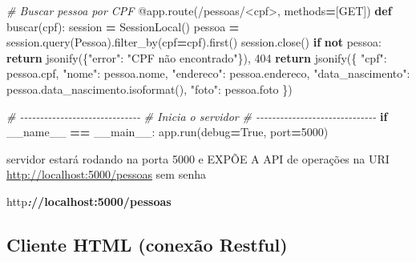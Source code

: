 \documentclass[
]{book}
\newenvironment{Shaded}{\begin{snugshade}}{\end{snugshade}}
\newcommand{\AttributeTok}[1]{\textcolor[rgb]{0.13,0.29,0.53}{#1}}
\newcommand{\CommentTok}[1]{\textcolor[rgb]{0.56,0.35,0.01}{\textit{#1}}}
\newcommand{\ControlFlowTok}[1]{\textcolor[rgb]{0.13,0.29,0.53}{\textbf{#1}}}
\newcommand{\DecValTok}[1]{\textcolor[rgb]{0.00,0.00,0.81}{#1}}
\newcommand{\ErrorTok}[1]{\textcolor[rgb]{0.64,0.00,0.00}{\textbf{#1}}}
\newcommand{\InformationTok}[1]{\textcolor[rgb]{0.56,0.35,0.01}{\textbf{\textit{#1}}}}
\newcommand{\KeywordTok}[1]{\textcolor[rgb]{0.13,0.29,0.53}{\textbf{#1}}}
\newcommand{\NormalTok}[1]{#1}
\newcommand{\OperatorTok}[1]{\textcolor[rgb]{0.81,0.36,0.00}{\textbf{#1}}}
\newcommand{\StringTok}[1]{\textcolor[rgb]{0.31,0.60,0.02}{#1}}
\newcommand{\VariableTok}[1]{\textcolor[rgb]{0.00,0.00,0.00}{#1}}
\begin{document}
\begin{Shaded}
\begin{Highlighting}[]
\CommentTok{\# Buscar pessoa por CPF}
\AttributeTok{@app.route}\NormalTok{(}\StringTok{\textquotesingle{}/pessoas/\textless{}cpf\textgreater{}\textquotesingle{}}\NormalTok{, methods}\OperatorTok{=}\NormalTok{[}\StringTok{\textquotesingle{}GET\textquotesingle{}}\NormalTok{])}
\KeywordTok{def}\NormalTok{ buscar(cpf):}
\NormalTok{    session }\OperatorTok{=}\NormalTok{ SessionLocal()}
\NormalTok{    pessoa }\OperatorTok{=}\NormalTok{ session.query(Pessoa).filter\_by(cpf}\OperatorTok{=}\NormalTok{cpf).first()}
\NormalTok{    session.close()}
    \ControlFlowTok{if} \KeywordTok{not}\NormalTok{ pessoa:}
        \ControlFlowTok{return}\NormalTok{ jsonify(\{}\StringTok{"error"}\NormalTok{: }\StringTok{"CPF não encontrado"}\NormalTok{\}), }\DecValTok{404}
    \ControlFlowTok{return}\NormalTok{ jsonify(\{}
        \StringTok{"cpf"}\NormalTok{: pessoa.cpf,}
        \StringTok{"nome"}\NormalTok{: pessoa.nome,}
        \StringTok{"endereco"}\NormalTok{: pessoa.endereco,}
        \StringTok{"data\_nascimento"}\NormalTok{: pessoa.data\_nascimento.isoformat(),}
        \StringTok{"foto"}\NormalTok{: pessoa.foto}
\NormalTok{    \})}

\CommentTok{\# {-}{-}{-}{-}{-}{-}{-}{-}{-}{-}{-}{-}{-}{-}{-}{-}{-}{-}{-}{-}{-}{-}{-}{-}{-}{-}{-}{-}{-}{-}}
\CommentTok{\# Inicia o servidor}
\CommentTok{\# {-}{-}{-}{-}{-}{-}{-}{-}{-}{-}{-}{-}{-}{-}{-}{-}{-}{-}{-}{-}{-}{-}{-}{-}{-}{-}{-}{-}{-}{-}}
\ControlFlowTok{if} \VariableTok{\_\_name\_\_} \OperatorTok{==} \StringTok{\textquotesingle{}\_\_main\_\_\textquotesingle{}}\NormalTok{:}
\NormalTok{    app.run(debug}\OperatorTok{=}\VariableTok{True}\NormalTok{, port}\OperatorTok{=}\DecValTok{5000}\NormalTok{)}
\end{Highlighting}
\end{Shaded}

servidor estará rodando na porta 5000 e EXPÕE A API de operações na URI \url{http://localhost:5000/pessoas} sem senha

\begin{Shaded}
\begin{Highlighting}[]
\NormalTok{http}\InformationTok{:}\ErrorTok{//localhost:5000/pessoas}
\end{Highlighting}
\end{Shaded}

\subsection{Cliente HTML (conexão Restful)}\label{cliente-html-conexuxe3o-restful}
\end{document}

